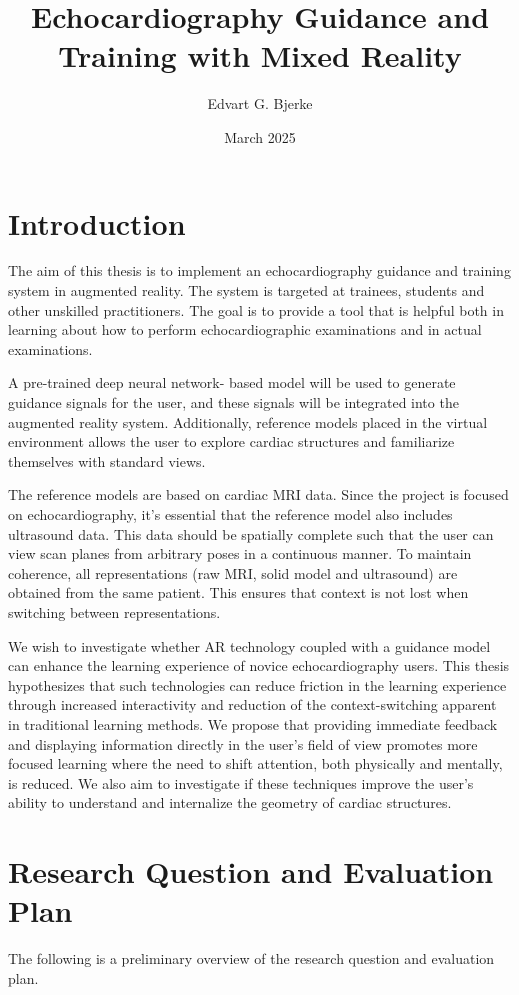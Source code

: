 \documentclass{article}
\title{Echocardiography Guidance and Training with Mixed Reality}
\author{Edvart G. Bjerke}
\date{March 2025}
\begin{document}
\maketitle

\section{Introduction}
The aim of this thesis is to implement an echocardiography guidance and training system in augmented reality. The system is targeted at trainees, students and other unskilled practitioners. 
The goal is to provide a tool that is helpful both in learning about how to perform echocardiographic examinations and in actual examinations.

A pre-trained deep neural network- based model will be used to generate guidance signals for the user, and these signals will be integrated into the augmented reality system.  
Additionally, reference models placed in the virtual environment allows the user to explore cardiac structures and familiarize themselves with
standard views. 

The reference models are based on cardiac MRI data. 
Since the project is focused on echocardiography, it's essential that the reference model also includes ultrasound data.
This data should be spatially complete such that the user can view scan planes from arbitrary poses in a continuous manner.
To maintain coherence, all representations (raw MRI, solid model and ultrasound) are obtained from the same patient. 
This ensures that context is not lost when switching between representations.

We wish to investigate whether AR technology coupled with a guidance model can enhance the learning experience of novice echocardiography users.
This thesis hypothesizes that such technologies can reduce friction in the learning experience through increased interactivity and reduction of the context-switching
apparent in traditional learning methods. We propose that providing immediate feedback and displaying information directly in the user's field of view 
promotes more focused learning where the need to shift attention, both physically and mentally, is reduced. We also aim to investigate if these techniques 
improve the user's ability to understand and internalize the geometry of cardiac structures.


\section{Research Question and Evaluation Plan}
The following is a preliminary overview of the research question and evaluation plan.
\end{document}
